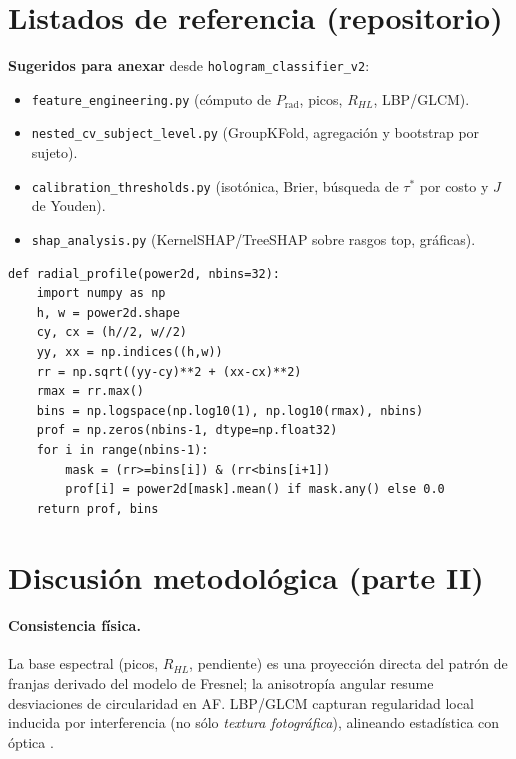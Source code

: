 \section{Listados de referencia (repositorio)}
\label{sec:listados}

\noindent\textbf{Sugeridos para anexar} desde \texttt{hologram\_classifier\_v2}:
\begin{itemize}
\item \texttt{feature\_engineering.py} (cómputo de $P_{\mathrm{rad}}$, picos, $R_{HL}$, LBP/GLCM).
\item \texttt{nested\_cv\_subject\_level.py} (GroupKFold, agregación y bootstrap por sujeto).
\item \texttt{calibration\_thresholds.py} (isotónica, Brier, búsqueda de $\tau^\ast$ por costo y $J$ de Youden).
\item \texttt{shap\_analysis.py} (KernelSHAP/TreeSHAP sobre rasgos top, gráficas).
\end{itemize}

\begin{verbatim}
def radial_profile(power2d, nbins=32):
    import numpy as np
    h, w = power2d.shape
    cy, cx = (h//2, w//2)
    yy, xx = np.indices((h,w))
    rr = np.sqrt((yy-cy)**2 + (xx-cx)**2)
    rmax = rr.max()
    bins = np.logspace(np.log10(1), np.log10(rmax), nbins)
    prof = np.zeros(nbins-1, dtype=np.float32)
    for i in range(nbins-1):
        mask = (rr>=bins[i]) & (rr<bins[i+1])
        prof[i] = power2d[mask].mean() if mask.any() else 0.0
    return prof, bins
\end{verbatim}

\section{Discusión metodológica (parte II)}
\paragraph{Consistencia física.} La base espectral (picos, $R_{HL}$, pendiente) es una proyección directa del patrón de franjas derivado del modelo de Fresnel; la anisotropía angular resume desviaciones de circularidad en AF. LBP/GLCM capturan regularidad local inducida por interferencia (no sólo \emph{textura fotográfica}), alineando estadística con óptica \cite{Chen2022Photonics,Greenbaum2014STM}.

